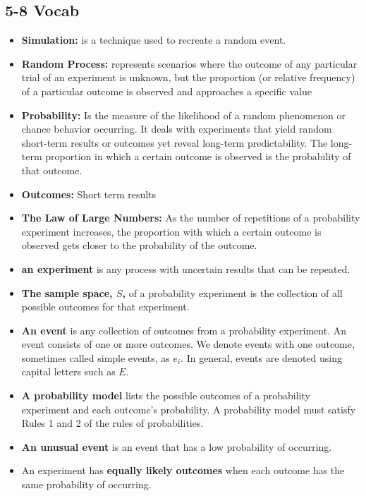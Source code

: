 \documentclass{report}
\begin{document}
    \pagebreak 
    \subsection*{5-8 Vocab}
    \bigbreak \noindent 
    \begin{itemize}
        \item \textbf{Simulation:} is a technique used to recreate a random event.
        \item \textbf{Random Process:} represents scenarios where the outcome of any particular trial of an experiment is unknown, but the proportion (or relative frequency) of a particular outcome is observed and approaches a specific value
        \item \textbf{Probability:} Is the measure of the likelihood of a random phenomenon or chance behavior occurring. It deals with experiments that yield random short-term results or outcomes yet reveal long-term predictability. The long-term proportion in which a certain outcome is observed is the probability of that outcome. 
        \item \textbf{Outcomes:} Short term results
        \item \textbf{The Law of Large Numbers:} As the number of repetitions of a probability experiment increases, the proportion with which a certain outcome is observed gets closer to the probability of the outcome.
        \item \textbf{an experiment} is any process with uncertain results that can be repeated.
        \item \textbf{The sample space, $S$,} of a probability experiment is the collection of all possible outcomes for that experiment.
        \item \textbf{An event} is any collection of outcomes from a probability experiment. An event consists of one or more outcomes. We denote events with one outcome, sometimes called simple events, as $e_{i}$. In general, events are denoted using capital letters such as $ E$.
        \item \textbf{A probability model} lists the possible outcomes of a probability experiment and each outcome's probability. A probability model must satisfy Rules 1 and 2 of the rules of probabilities.
        \item  \textbf{An unusual event} is an event that has a low probability of occurring.
        \item An experiment has \textbf{equally likely outcomes} when each outcome has the same probability of occurring. 

\end{itemize}
\end{document}
